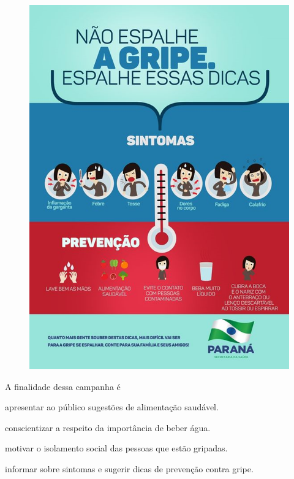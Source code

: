 \begin{figure}[htpb!]
\centering
\includegraphics[width=.7\textwidth]{media/image19.png}
\end{figure}

A finalidade dessa campanha é


\begin{escolha}
\item apresentar ao público sugestões de alimentação saudável.

\item conscientizar a respeito da importância de beber água.

\item motivar o isolamento social das pessoas que estão gripadas.

\item informar sobre sintomas e sugerir dicas de prevenção contra gripe.
\end{escolha}



